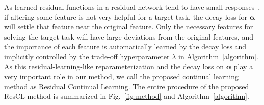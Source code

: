 \documentclass[letterpaper]{article}
\begin{document}
As learned residual functions in a residual network tend to have small responses~\cite{he2016deep}, if altering some feature is not very helpful for a target task, the decay loss for $\bm{\alpha}$ will settle that feature near the original feature. Only the necessary features for solving the target task will have large deviations from the original features, and the importance of each feature is automatically learned by the decay loss and implicitly controlled by the trade-off hyperparameter $\lambda$ in Algorithm~\ref{algorithm}. As this residual-learning-like reparameterization and the decay loss on $\bm{\alpha}$ play a very important role in our method, we call the proposed continual learning method as Residual Continual Learning. The entire procedure of the proposed ResCL method is summarized in Fig.~\ref{fig:method} and Algorithm~\ref{algorithm}.
\end{document}
